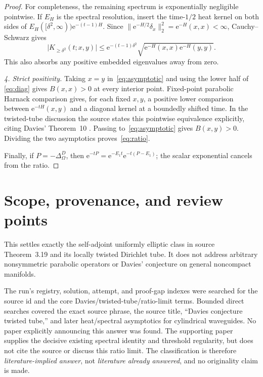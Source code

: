 \documentclass[11pt]{article}
\newcommand{\ee}{\mathrm e}
\begin{document}
\begin{proof}
For completeness, the remaining spectrum is exponentially negligible
pointwise.  If \(E_H\) is the spectral resolution, insert the time-\(1/2\)
heat kernel on both sides of
\(E_H([\delta^2,\infty))\ee^{-(t-1)H}\).  Since
\(\|\ee^{-H/2}\delta_x\|_2^2=\ee^{-H}(x,x)<\infty\), Cauchy--Schwarz gives
\[
 \bigl|K_{\geq\delta^2}(t;x,y)\bigr|
 \leq \ee^{-(t-1)\delta^2}
 \sqrt{\ee^{-H}(x,x)\ee^{-H}(y,y)}.
\]
This also absorbs any positive embedded eigenvalues away from zero.

\smallskip
\noindent\emph{4. Strict positivity.}
Taking \(x=y\) in~\eqref{eq:asymptotic} and using the lower half of
\eqref{eq:diag} gives \(B(x,x)>0\) at every interior point.  Fixed-point
parabolic Harnack comparison gives, for each fixed \(x,y\), a positive lower
comparison between \(\ee^{-tH}(x,y)\) and a diagonal kernel at a boundedly
shifted time.  In the twisted-tube discussion the source states this
pointwise equivalence explicitly, citing Davies' Theorem~10
\cite[PDF p.~2]{GKP}.  Passing to~\eqref{eq:asymptotic} gives
\(B(x,y)>0\).  Dividing the two asymptotics proves~\eqref{eq:ratio}.

Finally, if \(P=-\Delta^D_\Omega\), then
\(\ee^{-tP}=\ee^{-E_1t}\ee^{-t(P-E_1)}\); the scalar exponential cancels
from the ratio.
\end{proof}

\section{Scope, provenance, and review points}

This settles exactly the self-adjoint uniformly elliptic class in source
Theorem~3.19 and its locally twisted Dirichlet tube.  It does not address
arbitrary nonsymmetric parabolic operators or Davies' conjecture on general
noncompact manifolds.

The run's registry, solution, attempt, and proof-gap indexes were searched for
the source id and the core Davies/twisted-tube/ratio-limit terms.  Bounded
direct searches covered the exact source phrase, the source title, ``Davies
conjecture twisted tube,'' and later heat/spectral asymptotics for cylindrical
waveguides.  No paper explicitly announcing this answer was found.  The
supporting paper supplies the decisive existing spectral identity and
threshold regularity, but does not cite the source or discuss this ratio
limit.  The classification is therefore \emph{literature-implied answer}, not
\emph{literature already answered}, and no originality claim is made.
\end{document}
